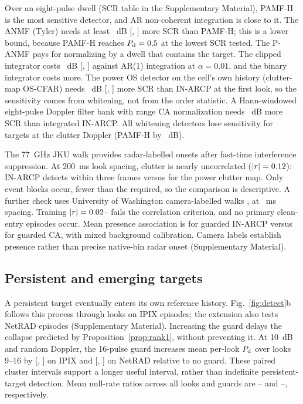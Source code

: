 \documentclass[journal]{IEEEtran}
\begin{document}
Over an eight-pulse dwell (SCR table in the Supplementary Material), PAMF-H is the most sensitive detector, and AR non-coherent integration is close to it. The ANMF (Tyler) needs at least \AFpMinusPamf~dB [\AFpMinusPamfLo, \AFpMinusPamfHi] more SCR than PAMF-H; this is a lower bound, because PAMF-H reaches $P_{\rm d}=0.5$ at the lowest SCR tested. The P-ANMF pays for normalizing by a dwell that contains the target. The clipped integrator costs \AClipMinusDin~dB [\AClipMinusDinLo, \AClipMinusDinHi] against AR(1) integration at $\alpha=0.01$, and the binary integrator costs more. The power OS detector on the cell's own history (clutter-map OS-CFAR) needs \AOsrawMinusIn~dB [\AOsrawMinusInLo, \AOsrawMinusInHi] more SCR than IN-ARCP at the first look, so the sensitivity comes from whitening, not from the order statistic. A Hann-windowed eight-pulse Doppler filter bank with range CA normalization needs \ClINvsMTD~dB more SCR than integrated IN-ARCP. All whitening detectors lose sensitivity for targets at the clutter Doppler (PAMF-H by \ClPAMFMatched~dB).

The 77~GHz JKU walk provides radar-labelled onsets after fast-time interference suppression. At 200~ms look spacing, clutter is nearly uncorrelated ($|r|=0.12$): IN-ARCP detects \PedIN{} within three frames versus \PedCA{} for the power clutter map. Only \PedBlocks{} event blocks occur, fewer than the \PedBlocksReq{} required, so the comparison is descriptive. A further check uses \UWRecordCount{} University of Washington camera-labelled walks \cite{uwraw2022,gao2021ramp}, at \UWFrameMs~ms spacing. Training $|r|=0.02$--\UWAbsRMax{} fails the correlation criterion, and no primary clean-entry episodes occur. Mean presence association is \UWINEight{} for guarded IN-ARCP versus \UWCAEight{} for guarded CA, with mixed background calibration. Camera labels establish presence rather than precise native-bin radar onset (Supplementary Material).

\subsection{Persistent and emerging targets}\label{sec:onset}
A persistent target eventually enters its own reference history. Fig.~\ref{fig:detect}b follows this process through \LongLooks{} looks on \LongIPIXSegments{} IPIX episodes; the extension also tests \LongNetRADSegments{} NetRAD episodes (Supplementary Material). Increasing the guard delays the collapse predicted by Proposition~\ref{prop:rank1}, without preventing it. At 10~dB and random Doppler, the 16-pulse guard increases mean per-look $P_{\rm d}$ over looks 9--16 by \LongIPIXGain{} [\LongIPIXGainLo, \LongIPIXGainHi] on IPIX and \LongNetRADGain{} [\LongNetRADGainLo, \LongNetRADGainHi] on NetRAD relative to no guard. These paired cluster intervals support a longer useful interval, rather than indefinite persistent-target detection. Mean null-rate ratios across all looks and guards are \LongIPIXNullMin--\LongIPIXNullMax{} and \LongNetRADNullMin--\LongNetRADNullMax{}, respectively.
\end{document}

